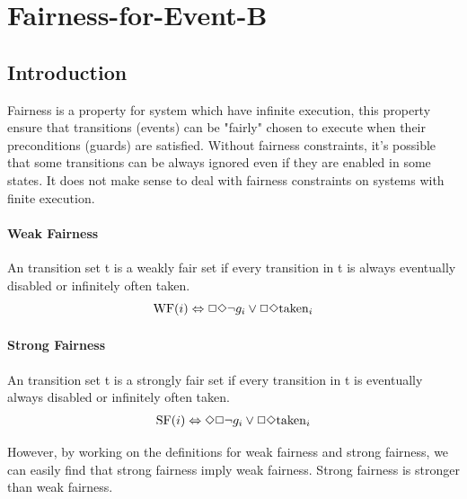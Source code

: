 
\section{Fairness-for-Event-B}
\label{sec:Fairness-for-Event-B}


\newcommand{\WF}{\mathrm{WF}}
\newcommand{\SF}{\mathrm{SF}}
\subsection{Introduction}
Fairness is a property for system which have infinite execution, this property ensure that transitions (events) can be "fairly" chosen to execute when their preconditions (guards) are satisfied. Without fairness constraints, it's possible that some transitions can be always ignored even if they are enabled in some states. It does not make sense to deal with fairness constraints on systems with finite execution.
\paragraph{Weak Fairness}
An transition set t is a weakly fair set if every transition in t is always eventually disabled or infinitely often taken.
\begin{displaymath}
  \WF(i)\Equiv\Always\Eventually\Not g_i\Or\Always\Eventually\mathrm{taken}_i
\end{displaymath}

\paragraph{Strong Fairness}
An transition set t is a strongly fair set if every transition in t is eventually always disabled or infinitely often taken.
\begin{gather*}
  \SF(i)\Equiv\Eventually\Always\Not g_i\Or\Always\Eventually{\mathrm{taken}}_i
\end{gather*}

However, by working on the definitions for weak fairness and strong fairness, we can easily find that strong fairness imply weak fairness. Strong fairness is stronger than weak fairness.  

